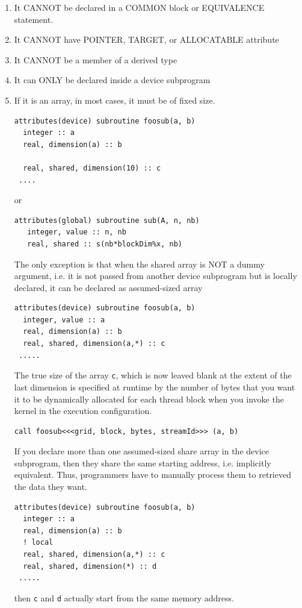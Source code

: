 \begin{enumerate}
\item It CANNOT be declared in a COMMON block or EQUIVALENCE
  statement.

\item It CANNOT have POINTER, TARGET, or ALLOCATABLE attribute

\item It CANNOT be a member of a derived type

\item It can ONLY be declared inside a device subprogram%

\item If it is an array, in most cases, it must be of fixed size. 
\begin{lstlisting}
attributes(device) subroutine foosub(a, b)
  integer :: a
  real, dimension(a) :: b
 
  real, shared, dimension(10) :: c
 ....
\end{lstlisting}
  or
\begin{lstlisting}
attributes(global) subroutine sub(A, n, nb)
   integer, value :: n, nb
   real, shared :: s(nb*blockDim%x, nb)
\end{lstlisting}

  The only exception is that \label{lab:assa} when the shared array is
  NOT a dummy argument, i.e. it is not passed from another device
  subprogram but is locally declared, it can be declared as
  assumed-sized array
\begin{lstlisting}
attributes(device) subroutine foosub(a, b)
  integer, value :: a
  real, dimension(a) :: b
  real, shared, dimension(a,*) :: c
 .....
\end{lstlisting}
  The true size of the array \verb!c!, which is now leaved blank at
  the extent of the last dimension is specified at runtime by the
  number of bytes that you want it to be dynamically allocated for
  each thread block when you invoke the kernel in the execution
  configuration.
\begin{lstlisting}
call foosub<<<grid, block, bytes, streamId>>> (a, b)
\end{lstlisting}

  If you declare more than one assumed-sized share array in the device
  subprogram, then they share the same starting address, i.e.
  implicitly equivalent. Thus, programmers have to manually process
  them to retrieved the data they want.
\begin{lstlisting}
attributes(device) subroutine foosub(a, b)
  integer :: a
  real, dimension(a) :: b
  ! local
  real, shared, dimension(a,*) :: c
  real, shared, dimension(*) :: d
 .....
\end{lstlisting}
  then \verb!c! and \verb!d! actually start from the same memory
  address.


\end{enumerate}
